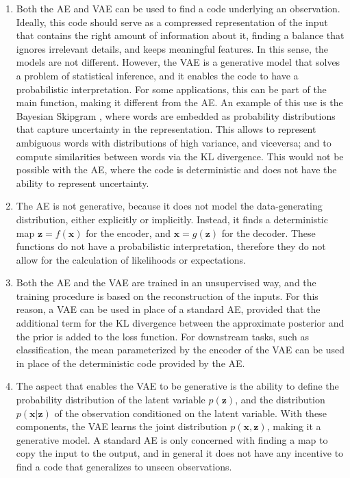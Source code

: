 \documentclass{article}
\begin{document}
\begin{enumerate}
\item Both the AE and VAE can be used to find a code underlying an observation. Ideally, this code should serve as a compressed representation of the input that contains the right amount of information about it, finding a balance that ignores irrelevant details, and keeps meaningful features. In this sense, the models are not different. However, the VAE is a generative model that solves a problem of statistical inference, and it enables the code to have a probabilistic interpretation. For some applications, this can be part of the main function, making it different from the AE. An example of this use is the Bayesian Skipgram \cite{bravzinskas2017embedding}, where words are embedded as probability distributions that capture uncertainty in the representation. This allows to represent ambiguous words with distributions of high variance, and viceversa; and to compute similarities between words via the KL divergence. This would not be possible with the AE, where the code is deterministic and does not have the ability to represent uncertainty.

\item The AE is not generative, because it does not model the data-generating distribution, either explicitly or implicitly. Instead, it finds a deterministic map $\mathbf{z} = f(\mathbf{x})$ for the encoder, and $\mathbf{x} = g(\mathbf{z})$ for the decoder. These functions do not have a probabilistic interpretation, therefore they do not allow for the calculation of likelihoods or expectations.

\item Both the AE and the VAE are trained in an unsupervised way, and the training procedure is based on the reconstruction of the inputs. For this reason, a VAE can be used in place of a standard AE, provided that the additional term for the KL divergence between the approximate posterior and the prior is added to the loss function. For downstream tasks, such as classification, the mean parameterized by the encoder of the VAE can be used in place of the deterministic code provided by the AE.

\item The aspect that enables the VAE to be generative is the ability to define the probability distribution of the latent variable $p(\mathbf{z})$, and the distribution $p(\mathbf{x}\vert\mathbf{z})$ of the observation conditioned on the latent variable. With these components, the VAE learns the joint distribution $p(\mathbf{x},\mathbf{z})$, making it a generative model. A standard AE is only concerned with finding a map to copy the input to the output, and in general it does not have any incentive to find a code that generalizes to unseen observations.
\end{enumerate}
\end{document}
